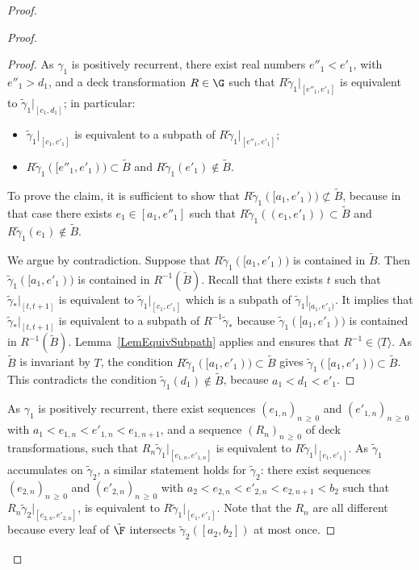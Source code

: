 \begin{proof}
\begin{proof}
\begin{proof}
As $\gamma_1$ is positively recurrent, there exist real numbers $e''_1<e'_1$, with $e''_1>d_1$, and a deck transformation $R\in\G$ such that $R\tilde\gamma_1|_{[e''_1,e'_1]}$ is equivalent to $\tilde\gamma_1|_{[c_1,d_1]}$; in particular:
\begin{itemize}
\item $\tilde\gamma_1|_{[c_1,c'_1]}$ is equivalent to a subpath of $R\tilde\gamma_1|_{[e''_1,e'_1]}$;
\item $R\tilde\gamma_1([e''_1,e'_1))\subset \tilde B$ and $R\tilde\gamma_1(e'_1)\notin \tilde B$.
\end{itemize}
To prove the claim, it is sufficient to show that $R\tilde\gamma_1([a_1,e'_1))\not\subset \tilde B$, because in that case there exists $e_1\in [a_1,e''_1]$ such that $R\tilde\gamma_1((e_1,e'_1))\subset \tilde B$ and $R\tilde\gamma_1(e_1)\notin \tilde B$.

We argue by contradiction. Suppose that $R\tilde\gamma_1([a_1,e'_1))$ is contained in $\tilde B$. Then $\tilde\gamma_1([a_1,e'_1))$ is contained in $R^{-1}(\tilde B)$. Recall that there exists $t$ such that $\tilde \gamma_*\vert_{[t,t+1]}$ is equivalent to $\tilde\gamma_1|_{[c_1, c'_1]}$ which is a subpath of $\tilde\gamma_1|_{[a_1,e'_1)}$. It implies that $\tilde \gamma_*\vert_{[t,t+1]}$ is equivalent to a subpath of $R^{-1}\tilde\gamma_*$ because $\tilde\gamma_1([a_1,e'_1))$ is contained in $R^{-1}(\tilde B)$. Lemma~\ref{LemEquivSubpath} applies and ensures that $R^{-1}\in\langle T\rangle$. As $\tilde B$ is invariant by $T$, the condition $R\tilde\gamma_1([a_1,e'_1))\subset \tilde B$ gives $\tilde\gamma_1([a_1,e'_1))\subset \tilde B$. This contradicts the condition $\tilde\gamma_1(d_1)\notin \tilde B$, because $a_1<d_1<e'_1$.
\end{proof}

As $\gamma_1$ is positively recurrent, there exist sequences $(e_{1,n})_{n\,\ge\,0}$ and $(e'_{1,n})_{n\,\ge\,0}$ with $a_1<e_{1,n}<e'_{1,n}<e_{1,n+1}$, and a sequence $(R_n)_{n\,\ge\,0}$ of deck transformations, such that $R_n \tilde\gamma_1|_{[e_{1,n},e'_{1,n}]}$ is equivalent to $R\tilde \gamma_1|_{[e_1,e'_1]}$. As $\tilde\gamma_1$ accumulates on $\tilde\gamma_2$, a similar statement holds for $\tilde\gamma_2$: there exist sequences $(e_{2,n})_{n\,\ge\,0}$ and $(e'_{2,n})_{n\,\ge\,0}$ with $a_2<e_{2,n}<e'_{2,n}<e_{2,n+1}<b_2$ such that $R_n \tilde\gamma_2|_{[e_{2,n},e'_{2,n}]}$, is equivalent to $R\tilde \gamma_1|_{[e_1,e'_1]}$. Note that the $R_n$ are all different because every leaf of $\tilde{\F}$ intersects $\tilde \gamma_2([a_2,b_2])$ at most once.


\end{proof}
\end{proof}
